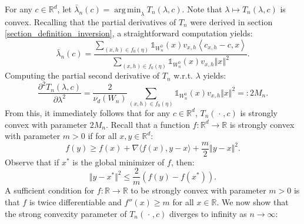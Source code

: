 \documentclass{article}
\newcommand{\RR}{\mathbb{R}}
\newcommand{\blank}{{\mspace{2mu}\cdot\mspace{2mu}}}
\DeclareMathOperator*{\argmin}{arg\,min}
\theoremstyle{plain}
\theoremstyle{remark}
\theoremstyle{definition}
\begin{document}
For any $c \in \RR^d$, let $\bar{\lambda}_n(c) = \argmin_{\lambda}T_n(\lambda, c)$. Note that $\lambda \mapsto T_n(\lambda,c)$ is convex. Recalling that the partial derivatives of $T_n$ were derived in section \ref{section_definition_inversion}, a straightforward computation yields:
\begin{equation}
    \bar{\lambda}_n(c) = \frac{\sum_{(x,h) \in f_0(\eta)} \mathds{1}_{W_n^0}(x) v_{x,h}\left\langle c_{x,h} - c, x \right\rangle}{\sum_{(x,h) \in f_0(\eta)} \mathds{1}_{W_n^0}(x) v_{x,h} \left\Vert x \right\Vert^2}.\label{lambda_c_def}
\end{equation}
Computing the partial second derivative of $T_n$ w.r.t. $\lambda$ yields:
\begin{equation}
    \frac{\partial^2 T_n(\lambda, c)}{\partial \lambda^2} = \frac{2}{\nu_d(W_n)}\sum_{(x,h) \in f_0(\eta)} \mathds{1}_{W_n^0}(x)v_{x,h}\Vert x \Vert^2 =:2M_n. \label{Mn0_def}
\end{equation}
From this, it immediately follows that for any $c \in \RR^d$, $T_n(\blank,c)$ is strongly convex with parameter $2M_n$. Recall that a function $f:\RR^d \to \RR$ is strongly convex with parameter $m > 0$ if for all $x,y \in \RR^d$:
\[f(y) \geq f(x) + \nabla \langle f(x),y-x\rangle + \frac{m}{2}\Vert y - x\Vert^2.\]
Observe that if $x^*$ is the global minimizer of $f$, then:
\begin{equation}
    \Vert y - x^*\Vert^2 \leq \frac{2}{m}\left(f(y) - f(x^*)\right).\label{stronglyconvex_minimizer}
\end{equation}
A sufficient condition for $f:\RR \to \RR$ to be strongly convex with parameter $m > 0$ is that $f$ is twice differentiable and $f''(x) \geq m$ for all $x \in \RR$. We now show that the strong convexity parameter of $T_n(\blank,c)$ diverges to infinity as $n \to \infty$:
\end{document}
